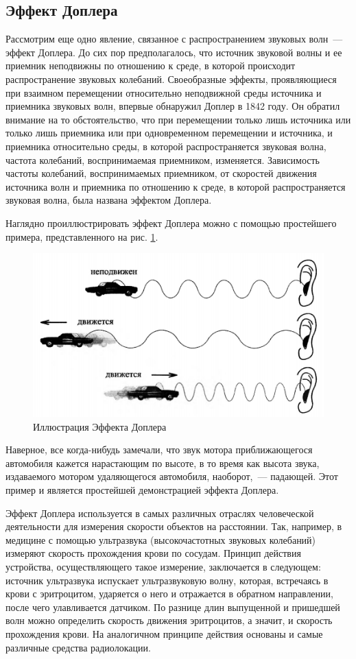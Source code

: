 \documentclass[oneside, final, 14pt]{extreport}
\begin{document}
\subsection{Эффект Доплера}
Рассмотрим еще одно явление, связанное с распространением звуковых волн~--- эффект Доплера. До сих пор предполагалось, что источник звуковой волны и ее приемник неподвижны по отношению к среде, в которой происходит распространение звуковых колебаний. Своеобразные эффекты, проявляющиеся при взаимном перемещении относительно неподвижной среды источника и приемника звуковых волн, впервые обнаружил Доплер в 1842 году. Он обратил внимание на то обстоятельство, что при перемещении только лишь источника или только лишь приемника или при одновременном перемещении и источника, и приемника относительно среды, в которой распространяется звуковая волна, частота колебаний, воспринимаемая приемником, изменяется. Зависимость частоты колебаний, воспринимаемых приемником, от скоростей движения источника волн и приемника по отношению к среде, в которой распространяется звуковая волна, была названа эффектом Доплера.

Наглядно проиллюстрировать эффект Доплера можно с помощью простейшего примера, представленного на рис. \ref{pic-dopler-01}.

\begin{figure}[h]
\centering
\includegraphics{pic-dopler-01}
\caption{Иллюстрация Эффекта Доплера}
\label{pic-dopler-01}
\end{figure}

Наверное, все когда-нибудь замечали, что звук мотора приближающегося автомобиля кажется нарастающим по высоте, в то время как высота звука, издаваемого мотором удаляющегося автомобиля, наоборот,~--- падающей. Этот пример и является простейшей демонстрацией эффекта Доплера.

Эффект Доплера используется в самых различных отраслях человеческой деятельности для измерения скорости объектов на расстоянии. Так, например, в медицине с помощью ультразвука (высокочастотных звуковых колебаний) измеряют скорость прохождения крови по сосудам. Принцип действия устройства, осуществляющего такое измерение, заключается в следующем: источник ультразвука испускает ультразвуковую волну, которая, встречаясь в крови с эритроцитом, ударяется о него и отражается в обратном направлении, после чего улавливается датчиком. По разнице длин выпущенной и пришедшей волн можно определить скорость движения эритроцитов, а значит, и скорость прохождения крови. На аналогичном принципе действия основаны и самые различные средства радиолокации.
\end{document}
